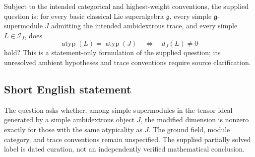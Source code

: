 \documentclass[11pt]{article}
\begin{document}
Subject to the intended categorical and highest-weight conventions, the supplied question is: for every basic classical Lie superalgebra \(\mathfrak g\), every simple \(\mathfrak g\)-supermodule \(J\) admitting the intended ambidextrous trace, and every simple \(L\in\mathcal I_J\), does
\[
 \operatorname{atyp}(L)=\operatorname{atyp}(J)
 \quad\Longleftrightarrow\quad
 d_J(L)\ne 0
\]
hold? This is a statement-only formulation of the supplied question; its unresolved ambient hypotheses and trace conventions require source clarification.
\subsection{Short English statement}
The question asks whether, among simple supermodules in the tensor ideal generated by a simple ambidextrous object \(J\), the modified dimension is nonzero exactly for those with the same atypicality as \(J\). The ground field, module category, and trace conventions remain unspecified. The supplied partially solved label is dated curation, not an independently verified mathematical conclusion.
\end{document}
